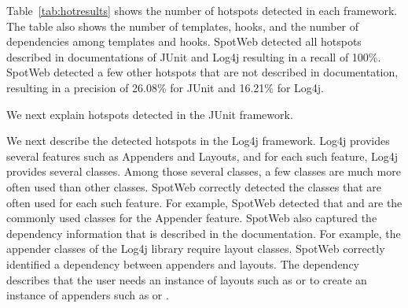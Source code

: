 Table~\ref{tab:hotresults} shows the number of hotspots detected in each framework.
The table also shows the number of templates, hooks, and the number of dependencies among 
templates and hooks. SpotWeb detected all hotspots described in documentations
of JUnit and Log4j resulting in a recall of 100\%. SpotWeb detected a few other hotspots that are not 
described in documentation, resulting in a precision of 26.08\% for JUnit and
16.21\% for Log4j. 

We next explain hotspots detected in the JUnit framework.

We next describe the detected hotspots in the Log4j framework.
Log4j provides several features such as Appenders and Layouts, and
for each such feature, Log4j provides several classes.
Among those several classes, a few classes are much more often 
used than other classes. SpotWeb correctly detected the classes that
are often used for each such feature. For example, SpotWeb detected that
 and  are the commonly used
classes for the Appender feature. SpotWeb also captured the dependency 
information that is described in the documentation.
For example, the appender classes of the Log4j library require layout classes.
SpotWeb correctly identified a  dependency between appenders
and layouts. The dependency describes that the user needs an instance of
layouts such as  or  to create an instance of appenders
such as  or .
